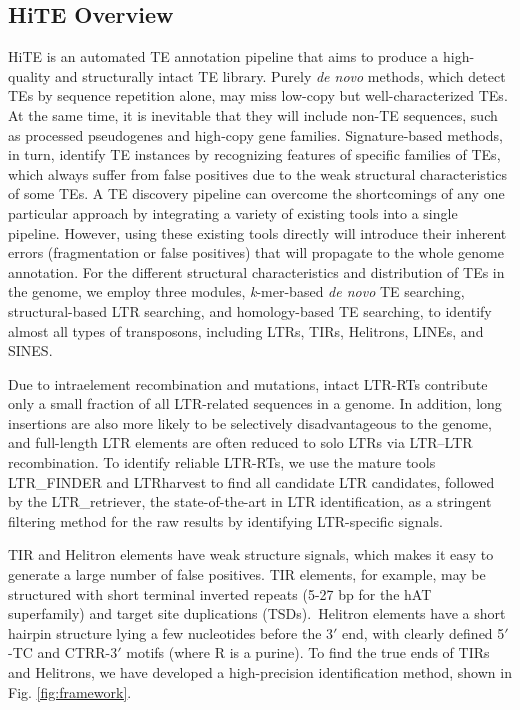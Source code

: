 \documentclass{bmcart}
\begin{document}
\subsection*{HiTE Overview}
HiTE is an automated TE annotation pipeline that aims to produce a high-quality and structurally intact TE library. Purely \emph{de novo} methods, which detect TEs by sequence repetition alone, may miss low-copy but well-characterized TEs. At the same time, it is inevitable that they will include non-TE sequences, such as processed pseudogenes and high-copy gene families. Signature-based methods, in turn, identify TE instances by recognizing features of specific families of TEs, which always suffer from false positives due to the weak structural characteristics of some TEs. A TE discovery pipeline can overcome the shortcomings of any one particular approach by integrating a variety of existing tools into a single pipeline. However, using these existing tools directly will introduce their inherent errors (fragmentation or false positives) that will propagate to the whole genome annotation.
For the different structural characteristics and distribution of TEs in the genome, we employ three modules, \emph{k}-mer-based \emph{de novo} TE searching, structural-based LTR searching, and homology-based TE searching, to identify almost all types of transposons, including LTRs, TIRs, Helitrons, LINEs, and SINES.

Due to intraelement recombination and mutations, intact LTR-RTs contribute only a small fraction of all LTR-related sequences in a genome\cite{ou2018ltr_retriever, ou2018assessing}. In addition, long insertions are also more likely to be selectively disadvantageous to the genome, and full-length LTR elements are often reduced to solo LTRs via LTR–LTR recombination\cite{storer2022methodologies, jedlicka2020can}. To identify reliable LTR-RTs, we use the mature tools LTR\_FINDER\cite{xu2007ltr_finder} and LTRharvest\cite{ellinghaus2008ltrharvest} to find all candidate LTR candidates, followed by the LTR\_retriever\cite{ou2018ltr_retriever}, the state-of-the-art in LTR identification, as a stringent filtering method for the raw results by identifying LTR-specific signals.

TIR and Helitron elements have weak structure signals, which makes it easy to generate a large number of false positives. TIR elements, for example, may be structured with short terminal inverted repeats (5-27 bp for the hAT superfamily) and target site duplications (TSDs). Helitron elements have a short hairpin structure lying a few nucleotides before the 3$'$ end, with clearly defined 5$'$-TC and CTRR-3$'$ motifs (where R is a purine). To find the true ends of TIRs and Helitrons, we have developed a high-precision identification method, shown in Fig. \ref{fig:framework}.
\end{document}
